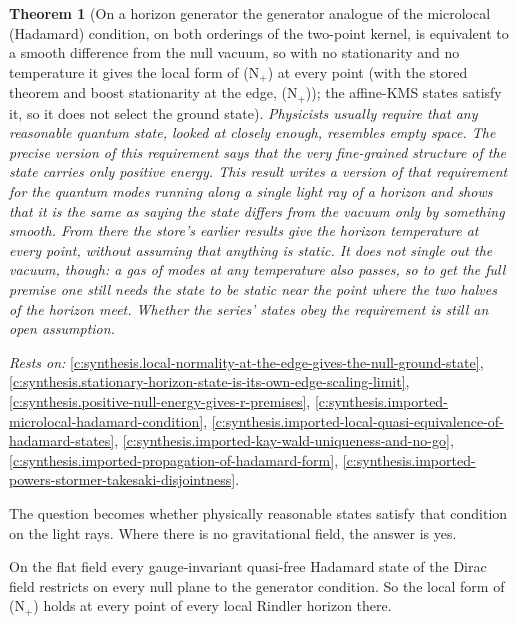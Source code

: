 \documentclass[11pt]{article}
\newtheorem{theorem}{Theorem}[section]
\theoremstyle{definition}
\theoremstyle{plain}
\begin{document}
\begin{theorem}[On a horizon generator the generator analogue of the microlocal (Hadamard) condition, on both orderings of the two-point kernel, is equivalent to a smooth difference from the null vacuum, so with no stationarity and no temperature it gives the local form of (N$_{+}$) at every point (with the stored theorem and boost stationarity at the edge, (N$_{+}$)); the affine-KMS states satisfy it, so it does not select the ground state]\label{c:synthesis.microlocal-condition-on-a-generator-gives-the-local-null-ground-state}
Physicists usually require that any reasonable quantum state, looked at closely enough, resembles empty space. The precise version of this requirement says that the very fine-grained structure of the state carries only positive energy. This result writes a version of that requirement for the quantum modes running along a single light ray of a horizon and shows that it is the same as saying the state differs from the vacuum only by something smooth. From there the store's earlier results give the horizon temperature at every point, without assuming that anything is static. It does not single out the vacuum, though: a gas of modes at any temperature also passes, so to get the full premise one still needs the state to be static near the point where the two halves of the horizon meet. Whether the series' states obey the requirement is still an open assumption.
\end{theorem}
\noindent\emph{Rests on:} \ref{c:synthesis.local-normality-at-the-edge-gives-the-null-ground-state}, \ref{c:synthesis.stationary-horizon-state-is-its-own-edge-scaling-limit}, \ref{c:synthesis.positive-null-energy-gives-r-premises}, \ref{c:synthesis.imported-microlocal-hadamard-condition}, \ref{c:synthesis.imported-local-quasi-equivalence-of-hadamard-states}, \ref{c:synthesis.imported-kay-wald-uniqueness-and-no-go}, \ref{c:synthesis.imported-propagation-of-hadamard-form}, \ref{c:synthesis.imported-powers-stormer-takesaki-disjointness}.

The question becomes whether physically reasonable states satisfy that condition on the light rays. Where there is no gravitational field, the answer is yes.

On the flat field every gauge-invariant quasi-free Hadamard state of the Dirac field restricts on every null plane to the generator condition. So the local form of (N$_{+}$) holds at every point of every local Rindler horizon there.
\end{document}
